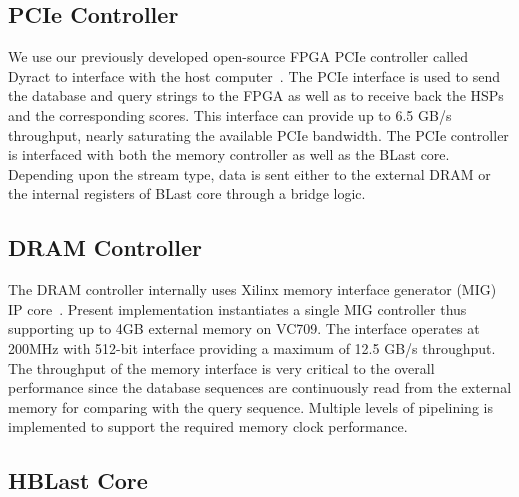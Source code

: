 \subsection{PCIe Controller}
We use our previously developed open-source FPGA PCIe controller called Dyract to interface with the host computer~\cite{Vipin2014}.
The PCIe interface is used to send the database and query strings to the FPGA as well as to receive back the HSPs and the corresponding scores.
This interface can provide up to 6.5 GB/s throughput, nearly saturating the available PCIe bandwidth.
The PCIe controller is interfaced with both the memory controller as well as the BLast core.
Depending upon the stream type, data is sent either to the external DRAM or the internal registers of BLast core through a bridge logic.


\subsection{DRAM Controller}
The DRAM controller internally uses Xilinx memory interface generator (MIG) IP core~\cite{mig2018}. 
Present implementation instantiates a single MIG controller thus supporting up to 4GB external memory on VC709.
The interface operates at 200MHz with 512-bit interface providing a maximum of 12.5 GB/s throughput.
The throughput of the memory interface is very critical to the overall performance since the database sequences are continuously read from the external memory for comparing with the query sequence.
Multiple levels of pipelining is implemented to support the required memory clock performance.

\subsection{HBLast Core}


